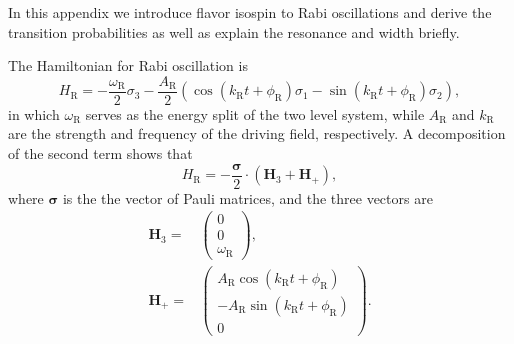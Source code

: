In this appendix we introduce flavor isospin \cite{Duan2006a} to Rabi oscillations and derive the transition probabilities as well as explain the resonance and width briefly.


The Hamiltonian for Rabi oscillation is
\begin{equation}
    H_{\mathrm R} = -\frac{\omega_{\mathrm R}}{2}\sigma_3 - \frac{A_{\mathrm{R}} }{2}  \left( \cos(k_{\mathrm{R}} t +\phi_{\mathrm{R}})\sigma_1  - \sin(k_{\mathrm{R}} t +\phi_{\mathrm{R}}) \sigma_2\right),
    \label{rabi-oscillation-single-perturbation}
\end{equation}
in which $\omega_{\mathrm R}$ serves as the energy split of the two level system, while $A_{\mathrm{R}}$ and $k_{\mathrm{R}}$ are the strength and frequency of the driving field, respectively. A decomposition of the second term shows that
\begin{equation*}
H_{\mathrm R}
= - \frac{\boldsymbol{\sigma}}{2} \cdot (\mathbf{H}_3 + \mathbf{H}_+ ) ,
\end{equation*}
where $\boldsymbol{\sigma}$ is the the vector of Pauli matrices, and the three vectors are
\begin{align}
    \mathbf{H}_3 = & \begin{pmatrix}
    0 \\ 0 \\ \omega_{\mathrm R}
    \end{pmatrix}, \\
    \mathbf{H}_+ = & \begin{pmatrix}
    A_{\mathrm{R}} \cos(k_{\mathrm{R}} t +\phi_{\mathrm{R}}) \\
    - A_{\mathrm{R}} \sin(k_{\mathrm{R}} t +\phi_{\mathrm{R}}) \\
    0
    \end{pmatrix}.
\end{align}

